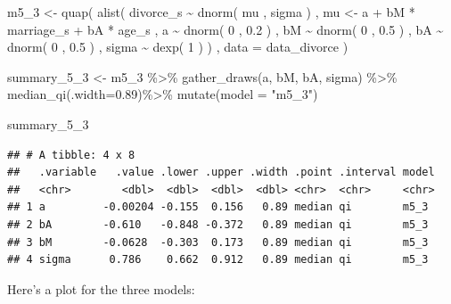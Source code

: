 \documentclass[
]{book}
\newenvironment{Shaded}{\begin{snugshade}}{\end{snugshade}}
\newcommand{\AttributeTok}[1]{\textcolor[rgb]{0.77,0.63,0.00}{#1}}
\newcommand{\DecValTok}[1]{\textcolor[rgb]{0.00,0.00,0.81}{#1}}
\newcommand{\FloatTok}[1]{\textcolor[rgb]{0.00,0.00,0.81}{#1}}
\newcommand{\FunctionTok}[1]{\textcolor[rgb]{0.00,0.00,0.00}{#1}}
\newcommand{\NormalTok}[1]{#1}
\newcommand{\OtherTok}[1]{\textcolor[rgb]{0.56,0.35,0.01}{#1}}
\newcommand{\SpecialCharTok}[1]{\textcolor[rgb]{0.00,0.00,0.00}{#1}}
\newcommand{\StringTok}[1]{\textcolor[rgb]{0.31,0.60,0.02}{#1}}
\begin{document}
\begin{Shaded}
\begin{Highlighting}[]
\NormalTok{m5\_3 }\OtherTok{\textless{}{-}} \FunctionTok{quap}\NormalTok{( }
  \FunctionTok{alist}\NormalTok{( }
\NormalTok{    divorce\_s }\SpecialCharTok{\textasciitilde{}} \FunctionTok{dnorm}\NormalTok{( mu , sigma ) , }
\NormalTok{    mu }\OtherTok{\textless{}{-}}\NormalTok{ a }\SpecialCharTok{+}\NormalTok{ bM }\SpecialCharTok{*}\NormalTok{ marriage\_s }\SpecialCharTok{+}\NormalTok{ bA }\SpecialCharTok{*}\NormalTok{ age\_s , }
\NormalTok{    a }\SpecialCharTok{\textasciitilde{}} \FunctionTok{dnorm}\NormalTok{( }\DecValTok{0}\NormalTok{ , }\FloatTok{0.2}\NormalTok{ ) , }
\NormalTok{    bM }\SpecialCharTok{\textasciitilde{}} \FunctionTok{dnorm}\NormalTok{( }\DecValTok{0}\NormalTok{ , }\FloatTok{0.5}\NormalTok{ ) ,}
\NormalTok{    bA }\SpecialCharTok{\textasciitilde{}} \FunctionTok{dnorm}\NormalTok{( }\DecValTok{0}\NormalTok{ , }\FloatTok{0.5}\NormalTok{ ) , }
\NormalTok{    sigma }\SpecialCharTok{\textasciitilde{}} \FunctionTok{dexp}\NormalTok{( }\DecValTok{1}\NormalTok{ )}
\NormalTok{) , }\AttributeTok{data =}\NormalTok{ data\_divorce )}

\NormalTok{summary\_5\_3 }\OtherTok{\textless{}{-}}\NormalTok{ m5\_3 }\SpecialCharTok{\%\textgreater{}\%}
  \FunctionTok{gather\_draws}\NormalTok{(a, bM, bA, sigma) }\SpecialCharTok{\%\textgreater{}\%}
  \FunctionTok{median\_qi}\NormalTok{(}\AttributeTok{.width=}\FloatTok{0.89}\NormalTok{)}\SpecialCharTok{\%\textgreater{}\%}
  \FunctionTok{mutate}\NormalTok{(}\AttributeTok{model =} \StringTok{"m5\_3"}\NormalTok{)}

\NormalTok{summary\_5\_3}
\end{Highlighting}
\end{Shaded}

\begin{verbatim}
## # A tibble: 4 x 8
##   .variable   .value .lower .upper .width .point .interval model
##   <chr>        <dbl>  <dbl>  <dbl>  <dbl> <chr>  <chr>     <chr>
## 1 a         -0.00204 -0.155  0.156   0.89 median qi        m5_3 
## 2 bA        -0.610   -0.848 -0.372   0.89 median qi        m5_3 
## 3 bM        -0.0628  -0.303  0.173   0.89 median qi        m5_3 
## 4 sigma      0.786    0.662  0.912   0.89 median qi        m5_3
\end{verbatim}

Here's a plot for the three models:
\end{document}
